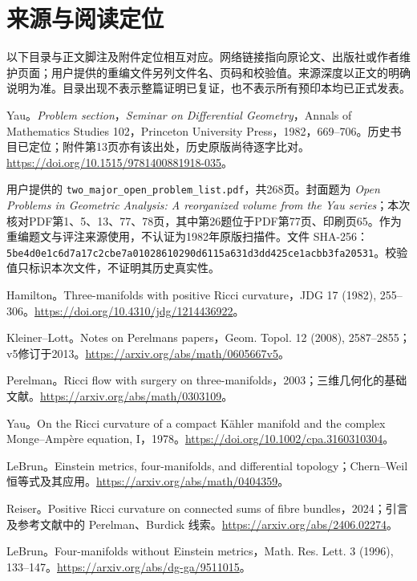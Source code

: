 \documentclass[11pt,a4paper]{article}
\theoremstyle{definition}
\begin{document}
\section{来源与阅读定位}
以下目录与正文脚注及附件定位相互对应。网络链接指向原论文、出版社或作者维护页面；用户提供的重编文件另列文件名、页码和校验值。来源深度以正文的明确说明为准。目录出现不表示整篇证明已复证，也不表示所有预印本均已正式发表。
\begin{enumerate}[label={[\arabic*]},leftmargin=2.2em,itemsep=0.55em]
\raggedright
\item Yau。\emph{Problem section}，\emph{Seminar on Differential Geometry}，Annals of Mathematics Studies 102，Princeton University Press，1982，669--706。历史书目已定位；附件第13页亦有该出处，历史原版尚待逐字比对。\url{https://doi.org/10.1515/9781400881918-035}。
\item 用户提供的 \texttt{two\_major\_open\_problem\_list.pdf}，共268页。封面题为 \emph{Open Problems in Geometric Analysis: A reorganized volume from the Yau series}；本次核对PDF第1、5、13、77、78页，其中第26题位于PDF第77页、印刷页65。作为重编题文与评注来源使用，不认证为1982年原版扫描件。文件 SHA-256：\nolinkurl{5be4d0e1c6d7a17c2cbe7a01028610290d6115a631d3dd425ce1acbb3fa20531}。校验值只标识本次文件，不证明其历史真实性。
\item Hamilton。Three-manifolds with positive Ricci curvature，JDG 17 (1982), 255--306。\url{https://doi.org/10.4310/jdg/1214436922}。
\item Kleiner--Lott。Notes on Perelman\textquotesingle s papers，Geom. Topol. 12 (2008), 2587--2855；v5修订于2013。\url{https://arxiv.org/abs/math/0605667v5}。
\item Perelman。Ricci flow with surgery on three-manifolds，2003；三维几何化的基础文献。\url{https://arxiv.org/abs/math/0303109}。
\item Yau。On the Ricci curvature of a compact Kähler manifold and the complex Monge--Ampère equation, I，1978。\url{https://doi.org/10.1002/cpa.3160310304}。
\item LeBrun。Einstein metrics, four-manifolds, and differential topology；Chern--Weil 恒等式及其应用。\url{https://arxiv.org/abs/math/0404359}。
\item Reiser。Positive Ricci curvature on connected sums of fibre bundles，2024；引言及参考文献中的 Perelman、Burdick 线索。\url{https://arxiv.org/abs/2406.02274}。
\item LeBrun。Four-manifolds without Einstein metrics，Math. Res. Lett. 3 (1996), 133--147。\url{https://arxiv.org/abs/dg-ga/9511015}。

\end{enumerate}
\end{document}

